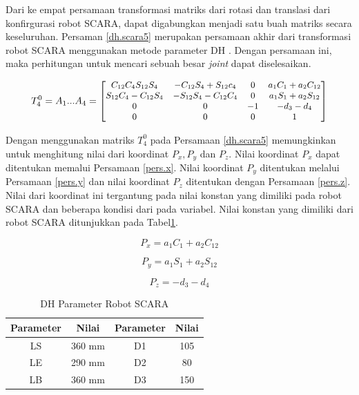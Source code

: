 Dari ke empat persamaan transformasi matriks dari rotasi dan translasi dari konfirgurasi robot SCARA, dapat digabungkan menjadi satu buah matriks secara keseluruhan. Persaman \ref{dh.scara5} merupakan persamaan akhir dari transformasi robot SCARA menggunakan metode parameter DH . Dengan persamaan ini, maka perhitungan untuk mencari sebuah besar \textit{joint} dapat diselesaikan.

\begin{equation}
\small
T_{4}^{0}=A_{1} ... A_{4} =
\begin{bmatrix}
C_{12}C_{4}S_{12}S_{4}&-C_{12}S_{4}+S_{12}c_{4}  & 0  & a_{1}C_{1}+a_{2}C_{12} \\ 
S_{12}C_{4}-C_{12}S_{4}&-S_{12}S_{4}-C_{12}C_{4} &0  &a_{1}S_{1}+a_{2}S_{12} \\ 
0 & 0 & -1 & -d_{3}-d_{4}\\ 
0 &0  &0  &1 
\end{bmatrix}
\label{dh.scara5}
\end{equation}

Dengan menggunakan matriks $T_{4}^{0}$ pada Persamaan \ref{dh.scara5} memungkinkan untuk menghitung nilai dari koordinat $P_{x}, P_{y}$ dan $P_{z}$. Nilai koordinat $P_{x}$ dapat ditentukan memalui Persamaan \ref{pers.x}. Nilai koordinat $P_{y}$ ditentukan melalui Persamaan \ref{pers.y} dan nilai koordinat $P_{z}$ ditentukan dengan Persamaan \ref{pers.z}. Nilai dari koordinat ini tergantung pada nilai konstan yang dimiliki pada robot SCARA dan beberapa kondisi dari pada variabel. Nilai konstan yang dimiliki dari robot SCARA ditunjukkan pada Tabel\ref{tbl.konstanscara}.

\begin{equation}
P_{x}=a_{1}C_{1}+a_{2}C_{12}
\label{pers.x}
\end{equation}

\begin{equation}
P_{y}=a_{1}S_{1}+a_{2}S_{12}
\label{pers.y}
\end{equation}

\begin{equation}
P_{z}=-d_{3}-d_{4}
\label{pers.z}
\end{equation}

\begin{table}[H]
	\centering
	\caption{DH Parameter Robot SCARA}
		\label{tbl.konstanscara}
	\begin{tabular}{|c|c|c|c|}
		\hline
		\rowcolor[HTML]{9B9B9B} 
		Parameter & Nilai & Parameter & Nilai  \\ \hline
		LS    & 360 mm & D1      & 105          \\ \hline
		LE    & 290 mm &D2    & 80       \\ \hline
		LB    & 360 mm     & D3      &150    \\ \hline

	\end{tabular}
	
\end{table}

